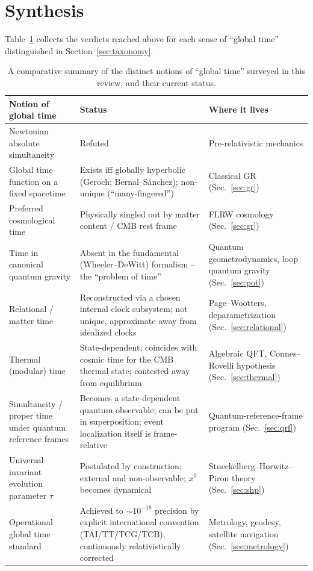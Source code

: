 \documentclass[11pt]{article}
\begin{document}
\section{Synthesis}
\label{sec:synthesis}

Table~\ref{tab:synthesis} collects the verdicts reached above for each sense of ``global time'' distinguished in Section~\ref{sec:taxonomy}.

\begin{table}[htbp]
\centering
\small
\renewcommand{\arraystretch}{1.35}
\begin{tabular}{@{}p{3.6cm}p{5.6cm}p{5.6cm}@{}}
\toprule
\textbf{Notion of global time} & \textbf{Status} & \textbf{Where it lives} \\
\midrule
Newtonian absolute simultaneity & Refuted & Pre-relativistic mechanics \\
Global time function on a fixed spacetime & Exists iff globally hyperbolic (Geroch; Bernal--S\'anchez); non-unique (``many-fingered'') & Classical GR (Sec.~\ref{sec:gr}) \\
Preferred cosmological time & Physically singled out by matter content / CMB rest frame & FLRW cosmology (Sec.~\ref{sec:gr}) \\
Time in canonical quantum gravity & Absent in the fundamental (Wheeler--DeWitt) formalism -- the ``problem of time'' & Quantum geometrodynamics, loop quantum gravity (Sec.~\ref{sec:pot}) \\
Relational / matter time & Reconstructed via a chosen internal clock subsystem; not unique, approximate away from idealized clocks & Page--Wootters, deparametrization (Sec.~\ref{sec:relational}) \\
Thermal (modular) time & State-dependent; coincides with cosmic time for the CMB thermal state; contested away from equilibrium & Algebraic QFT, Connes--Rovelli hypothesis (Sec.~\ref{sec:thermal}) \\
Simultaneity / proper time under quantum reference frames & Becomes a state-dependent quantum observable; can be put in superposition; event localization itself is frame-relative & Quantum-reference-frame program (Sec.~\ref{sec:qrf}) \\
Universal invariant evolution parameter $\tau$ & Postulated by construction; external and non-observable; $x^0$ becomes dynamical & Stueckelberg--Horwitz--Piron theory (Sec.~\ref{sec:shp}) \\
Operational global time standard & Achieved to $\sim 10^{-18}$ precision by explicit international convention (TAI/TT/TCG/TCB), continuously relativistically corrected & Metrology, geodesy, satellite navigation (Sec.~\ref{sec:metrology}) \\
\bottomrule
\end{tabular}
\caption{A comparative summary of the distinct notions of ``global time'' surveyed in this review, and their current status.}
\label{tab:synthesis}
\end{table}
\end{document}

